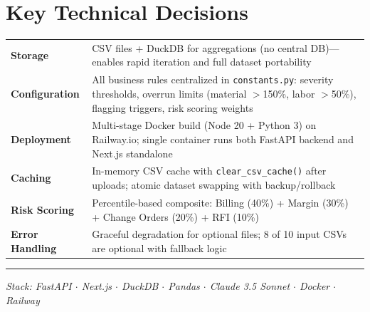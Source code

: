 \documentclass[11pt,a4paper]{article}
\begin{document}
\section{Key Technical Decisions}

\begin{tabular}{@{}p{3cm}p{11cm}@{}}
\textbf{Storage} & CSV files + DuckDB for aggregations (no central DB)---enables rapid iteration and full dataset portability \\[0.3em]
\textbf{Configuration} & All business rules centralized in \texttt{constants.py}: severity thresholds, overrun limits (material $>$150\%, labor $>$50\%), flagging triggers, risk scoring weights \\[0.3em]
\textbf{Deployment} & Multi-stage Docker build (Node 20 + Python 3) on Railway.io; single container runs both FastAPI backend and Next.js standalone \\[0.3em]
\textbf{Caching} & In-memory CSV cache with \texttt{clear\_csv\_cache()} after uploads; atomic dataset swapping with backup/rollback \\[0.3em]
\textbf{Risk Scoring} & Percentile-based composite: Billing (40\%) + Margin (30\%) + Change Orders (20\%) + RFI (10\%) \\[0.3em]
\textbf{Error Handling} & Graceful degradation for optional files; 8 of 10 input CSVs are optional with fallback logic
\end{tabular}

\vspace{0.8em}
\hrule
\vspace{0.3em}
\begin{center}
\small\textit{Stack: FastAPI $\cdot$ Next.js $\cdot$ DuckDB $\cdot$ Pandas $\cdot$ Claude 3.5 Sonnet $\cdot$ Docker $\cdot$ Railway}
\end{center}
\end{document}
